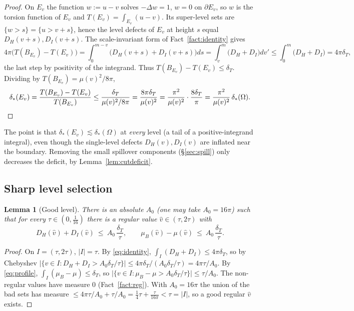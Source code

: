 \documentclass[11pt]{article}
\newtheorem{lemma}[theorem]{Lemma}
\theoremstyle{definition}
\newcommand{\Om}{\Omega}
\newcommand{\dT}{\delta_T}
\newcommand{\abs}[1]{\left|#1\right|}
\newcommand{\dstar}{\delta_{*}}
\begin{document}
\begin{proof}
On $E_v$ the function $w:=u-v$ solves $-\Delta w=1$, $w=0$ on
$\partial E_v$, so $w$ is the torsion function of $E_v$ and
$T(E_v)=\int_{E_v}(u-v)$. Its super-level sets are $\{w>s\}=\{u>v+s\}$,
hence the level defects of $E_v$ at height $s$ equal $D_H(v+s),D_I(v+s)$.
The scale-invariant form of Fact~\ref{fact:identity} gives
\[
   4\pi\bigl(T(B_{E_v})-T(E_v)\bigr)
   =\int_0^{m-v}\!\bigl(D_H(v+s)+D_I(v+s)\bigr)ds
   =\int_v^m\!\bigl(D_H+D_I\bigr)dv'
   \le\int_0^m\!\bigl(D_H+D_I\bigr)=4\pi\dT,
\]
the last step by positivity of the integrand. Thus
$T(B_{E_v})-T(E_v)\le\dT$. Dividing by $T(B_{E_v})=\mu(v)^2/8\pi$,
\[
   \dstar(E_v)=\frac{T(B_{E_v})-T(E_v)}{T(B_{E_v})}
   \le\frac{\dT}{\mu(v)^2/8\pi}=\frac{8\pi\dT}{\mu(v)^2}
   =\frac{\pi^2}{\mu(v)^2}\cdot\frac{8\dT}{\pi}
   =\frac{\pi^2}{\mu(v)^2}\,\dstar(\Om).\qedhere
\]
\end{proof}

The point is that $\dstar(E_v)\lesssim\dstar(\Om)$ at \emph{every} level (a
tail of a positive-integrand integral), even though the single-level defects
$D_H(v),D_I(v)$ are inflated near the boundary. Removing the small spillover
components (\S\ref{sec:spill}) only decreases the deficit, by
Lemma~\ref{lem:cutdeficit}.

\subsection{Sharp level selection}\label{sec:select}

\begin{lemma}[Good level]\label{lem:level}
There is an absolute $A_0$ \textup{(}one may take $A_0=16\pi$\textup{)} such
that for every $\tau\in(0,\tfrac1{16})$ there is a regular value
$\hat v\in(\tau,2\tau)$ with
\begin{equation}\label{eq:goodlevel}
   D_H(\hat v)+D_I(\hat v)\ \le\ A_0\,\frac{\dT}{\tau},
   \qquad
   \mu_B(\hat v)-\mu(\hat v)\ \le\ A_0\,\frac{\dT}{\tau}.
\end{equation}
\end{lemma}

\begin{proof}
On $I=(\tau,2\tau)$, $\abs I=\tau$. By \eqref{eq:identity},
$\int_I(D_H+D_I)\le4\pi\dT$, so by Chebyshev
$\bigl|\{v\in I:D_H+D_I>A_0\dT/\tau\}\bigr|\le4\pi\dT/(A_0\dT/\tau)
=4\pi\tau/A_0$. By \eqref{eq:profile}, $\int_I(\mu_B-\mu)\le\dT$, so
$\bigl|\{v\in I:\mu_B-\mu>A_0\dT/\tau\}\bigr|\le\tau/A_0$. The non-regular
values have measure $0$ (Fact~\ref{fact:reg}). With $A_0=16\pi$ the union of
the bad sets has measure $\le4\pi\tau/A_0+\tau/A_0=\tfrac14\tau+\tfrac
\tau{16\pi}<\tau=\abs I$, so a good regular $\hat v$ exists.
\end{proof}
\end{document}
